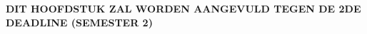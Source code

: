 \chapter{}%
\label{ch:controle}

\textbf{DIT HOOFDSTUK ZAL WORDEN AANGEVULD TEGEN DE 2DE DEADLINE (SEMESTER 2)}